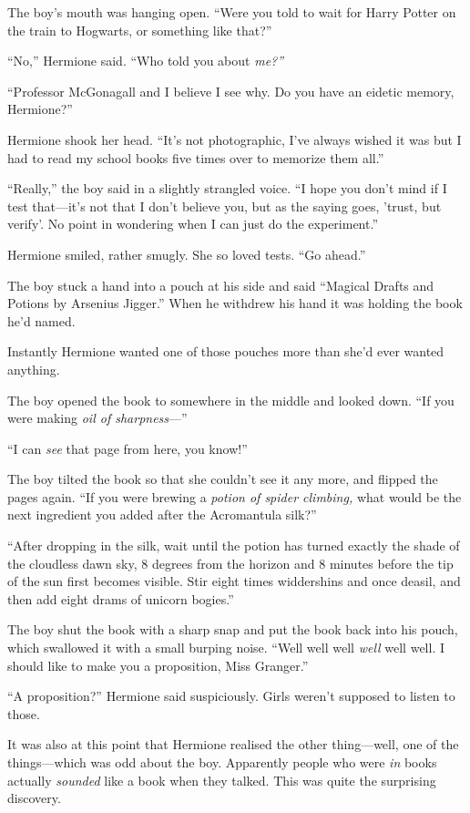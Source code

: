 The boy's mouth was hanging open. ``Were you told to wait for Harry
Potter on the train to Hogwarts, or something like that?''

``No,'' Hermione said. ``Who told you about \emph{me?''}

``Professor McGonagall and I believe I see why. Do you have an eidetic
memory, Hermione?''

Hermione shook her head. ``It's not photographic, I've always wished it
was but I had to read my school books five times over to memorize them
all.''

``Really,'' the boy said in a slightly strangled voice. ``I hope you
don't mind if I test that---it's not that I don't believe you, but as
the saying goes, 'trust, but verify'. No point in wondering when I can
just do the experiment.''

Hermione smiled, rather smugly. She so loved tests. ``Go ahead.''

The boy stuck a hand into a pouch at his side and said ``Magical Drafts
and Potions by Arsenius Jigger.'' When he withdrew his hand it was
holding the book he'd named.

Instantly Hermione wanted one of those pouches more than she'd ever
wanted anything.

The boy opened the book to somewhere in the middle and looked down. ``If
you were making \emph{oil of sharpness}---''

``I can \emph{see} that page from here, you know!''

The boy tilted the book so that she couldn't see it any more, and
flipped the pages again. ``If you were brewing a \emph{potion of spider
climbing,} what would be the next ingredient you added after the
Acromantula silk?''

``After dropping in the silk, wait until the potion has turned exactly
the shade of the cloudless dawn sky, 8 degrees from the horizon and 8
minutes before the tip of the sun first becomes visible. Stir eight
times widdershins and once deasil, and then add eight drams of unicorn
bogies.''

The boy shut the book with a sharp snap and put the book back into his
pouch, which swallowed it with a small burping noise. ``Well well well
\emph{well} well well. I should like to make you a proposition, Miss
Granger.''

``A proposition?'' Hermione said suspiciously. Girls weren't supposed to
listen to those.

It was also at this point that Hermione realised the other thing---well,
one of the things---which was odd about the boy. Apparently people who
were \emph{in} books actually \emph{sounded} like a book when they
talked. This was quite the surprising discovery.

